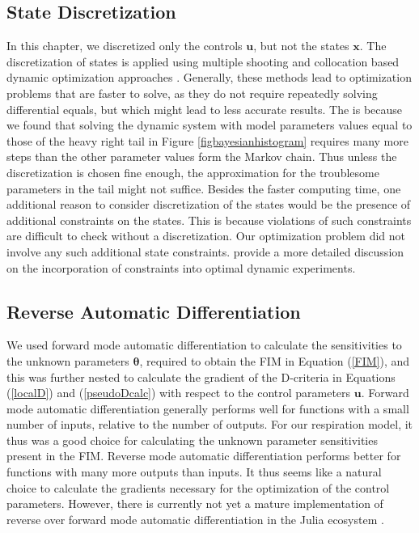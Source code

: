 \subsection{State Discretization}
In this chapter, we discretized only the controls $\bm u$, but not the states $\bm x$. The discretization of states is applied using multiple shooting and collocation based dynamic optimization approaches \parencite{biegler}. Generally, these methods lead to optimization problems that are faster to solve, as they do not require repeatedly solving differential equals, but which might lead {\color{red}to less accurate results. The is because we found that solving the dynamic system with model parameters values equal to those of the heavy right tail in Figure \ref{figbayesianhistogram} requires many more steps than the other parameter values form the Markov chain. Thus unless the discretization is chosen fine enough, the approximation for the troublesome parameters in the tail might not suffice.}  Besides the faster computing time, one additional reason to consider discretization of the states would be the presence of additional constraints on the states. This is because violations of such constraints are difficult to check without a discretization. Our optimization problem did not involve any such additional state constraints. \textcite{nimmegeers} provide a more detailed discussion on the incorporation of constraints into optimal dynamic experiments.
\subsection{Reverse Automatic Differentiation}
We used forward mode automatic differentiation to calculate the sensitivities to the unknown parameters $\bm \theta$, required to obtain the FIM in Equation (\ref{FIM}), and this was further nested to calculate the gradient of the D-criteria in Equations (\ref{localD}) and (\ref{pseudoDcalc}) with respect to the control parameters $\bm u$. Forward mode automatic differentiation generally performs well for functions with a small number of inputs, relative to the number of outputs. For our respiration model, it thus was a good choice for calculating the unknown parameter sensitivities present in the FIM. Reverse mode automatic differentiation performs better for functions with many more outputs than inputs. It thus seems like a natural choice to calculate the gradients necessary for the optimization of the control parameters. However, there is currently not yet a mature implementation of reverse over forward mode automatic differentiation in the Julia ecosystem \parencite{rackauckas2}.
